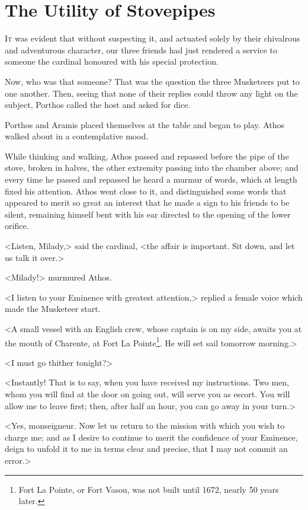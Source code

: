 
\chapter{The Utility of Stovepipes}

\lettrine[]{I}{t} was evident that without suspecting it, and actuated solely by their chivalrous and adventurous character, our three friends had just rendered a service to someone the cardinal honoured with his special protection. 

Now, who was that someone? That was the question the three Musketeers put to one another. Then, seeing that none of their replies could throw any light on the subject, Porthos called the host and asked for dice. 

Porthos and Aramis placed themselves at the table and began to play. Athos walked about in a contemplative mood. 

While thinking and walking, Athos passed and repassed before the pipe of the stove, broken in halves, the other extremity passing into the chamber above; and every time he passed and repassed he heard a murmur of words, which at length fixed his attention. Athos went close to it, and distinguished some words that appeared to merit so great an interest that he made a sign to his friends to be silent, remaining himself bent with his ear directed to the opening of the lower orifice. 

<Listen, Milady,> said the cardinal, <the affair is important. Sit down, and let us talk it over.> 

<Milady!> murmured Athos. 

<I listen to your Eminence with greatest attention,> replied a female voice which made the Musketeer start. 

<A small vessel with an English crew, whose captain is on my side, awaits you at the mouth of Charente, at Fort La Pointe\footnote{Fort La Pointe, or Fort Vasou, was not built until 1672, nearly 50 years later. }. He will set sail tomorrow morning.> 

<I must go thither tonight?> 

<Instantly! That is to say, when you have received my instructions. Two men, whom you will find at the door on going out, will serve you as escort. You will allow me to leave first; then, after half an hour, you can go away in your turn.> 

<Yes, monseigneur. Now let us return to the mission with which you wish to charge me; and as I desire to continue to merit the confidence of your Eminence, deign to unfold it to me in terms clear and precise, that I may not commit an error.> 

